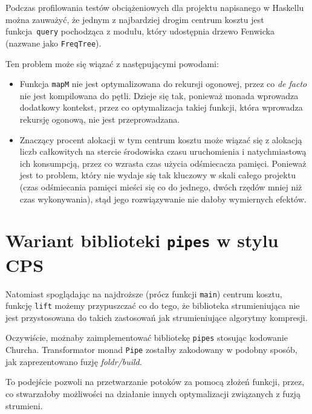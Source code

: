 \documentclass[../../praca.tex]{subfiles}
\begin{document}
Podczas profilowania testów obciążeniowych dla projektu napisanego w Haskellu
można zauważyć, że jednym z najbardziej drogim centrum kosztu jest
funkcja~\texttt{query} pochodząca z modułu, który udostępnia
drzewo Fenwicka (nazwane jako \texttt{FreqTree}). 

Ten problem może się wiązać z następującymi powodami:
\begin{itemize}
  \item Funkcja \texttt{mapM} nie jest optymalizowana do rekursji ogonowej,
    przez co \emph{de facto} nie jest kompilowana do pętli. Dzieje się tak,
    ponieważ monada wprowadza dodatkowy kontekst, przez co optymalizacja
    takiej funkcji, która wprowadza rekursję ogonową, nie jest przeprowadzana.
  \item Znaczący procent alokacji w tym centrum kosztu może wiązać się z
    alokacją liczb całkowitych na stercie środowiska czasu uruchomienia
    i natychmiastową ich konsumpcją, przez co wzrasta czas użycia odśmiecacza
    pamięci. Ponieważ jest to problem, który nie wydaje się tak kluczowy
    w skali całego projektu (czas odśmiecania pamięci mieści się co do
    jednego, dwóch rzędów mniej niż czas wykonywania), stąd jego rozwiązywanie
    nie dałoby wymiernych efektów.
\end{itemize}

\section{Wariant biblioteki \texttt{pipes} w stylu CPS}

Natomiast spoglądając na najdroższe (prócz funkcji \texttt{main}) centrum kosztu,
funkcję \texttt{lift} możemy przypuszczać co do tego, że biblioteka strumieniująca
nie jest przystosowana do takich zastosowań jak strumieniujące algorytmy
kompresji.

Oczywiście, możnaby zaimplementować bibliotekę \texttt{pipes}
stosując kodowanie Churcha. Transformator monad \texttt{Pipe} 
zostałby zakodowany w podobny sposób, jak zaprezentowano
fuzję \emph{foldr/build}. 

To podejście pozwoli na przetwarzanie potoków za pomocą złożeń funkcji,
przez, co stwarzałoby możliwości na działanie innych optymalizacji związanych
z fuzją strumieni.
\end{document}
